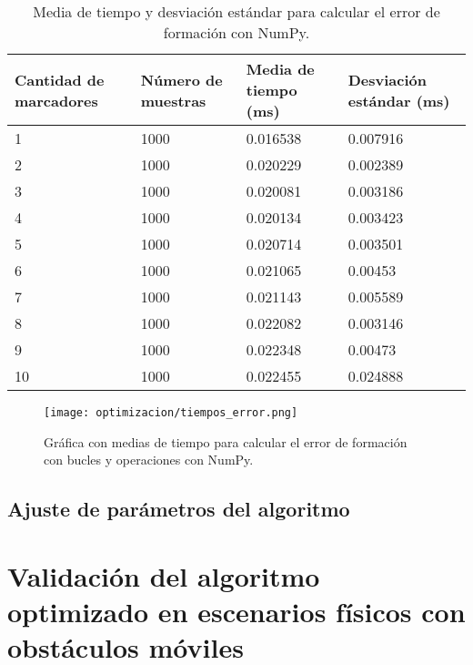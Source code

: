 \begin{table}[H]
	\centering
	\resizebox{\textwidth}{!} {
	\begin{tabular}{|l|l|l|l|}
		\hline
		\textbf{Cantidad de marcadores} & \textbf{Número de muestras} & \textbf{Media de tiempo (ms)} & \textbf{Desviación estándar (ms)} \\ \hline
		1 & 1000 & 0.016538 & 0.007916 \\ \hline
		2 & 1000 & 0.020229 & 0.002389 \\ \hline
		3 & 1000 & 0.020081 & 0.003186 \\ \hline
		4 & 1000 & 0.020134 & 0.003423 \\ \hline
		5 & 1000 & 0.020714 & 0.003501 \\ \hline
		6 & 1000 & 0.021065 & 0.00453 \\ \hline
		7 & 1000 & 0.021143 & 0.005589 \\ \hline
		8 & 1000 & 0.022082 & 0.003146 \\ \hline
		9 & 1000 & 0.022348 & 0.00473 \\ \hline
		10 & 1000 & 0.022455 & 0.024888 \\ \hline
	\end{tabular}}
	\caption{Media de tiempo y desviación estándar para calcular el error de formación con NumPy.}
	\label{cuadro:tiempos_error_numpy}
\end{table}

\begin{figure}[H]
	\centering
	\texttt{[image: optimizacion/tiempos\_error.png]}
	\caption{Gráfica con medias de tiempo para calcular el error de formación con bucles y operaciones con NumPy.}
	\label{fig:grafica_tiempos_error}
\end{figure}

\section{Ajuste de parámetros del algoritmo}

\chapter{Validación del algoritmo optimizado en escenarios físicos con obstáculos móviles}\label{cap:validacion}







